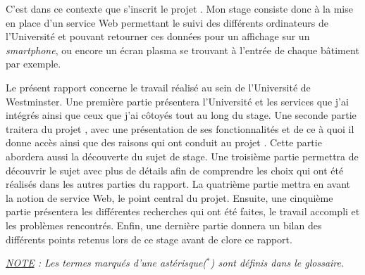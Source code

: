 C'est dans ce contexte que s'inscrit le projet \YuukouII. 
Mon stage consiste donc \`a la mise en place d'un service Web permettant le suivi des diff\'erents ordinateurs de l'Universit\'e et pouvant retourner ces donn\'ees pour un affichage sur un \textit{smartphone}, ou encore un \'ecran plasma se trouvant \`a l'entr\'ee de chaque b\^atiment par exemple.

Le pr\'esent rapport concerne le travail r\'ealis\'e au sein de l'Universit\'e de Westminster.
Une premi\`ere partie pr\'esentera l'Universit\'e et les services que j'ai int\'egr\'es ainsi que ceux que j'ai c\^otoy\'es tout au long du stage.
Une seconde partie traitera du projet \Yuukou{}, avec une pr\'esentation de ses fonctionnalit\'es et de ce \`a quoi il donne acc\`es  ainsi que des raisons qui ont conduit au projet \YuukouII.
Cette partie abordera aussi la d\'ecouverte du sujet de stage.
Une troisi\`eme partie permettra de d\'ecouvrir le sujet avec plus de d\'etails afin de comprendre les choix qui ont \'et\'e r\'ealis\'es dans les autres parties du rapport.
La quatri\`eme partie mettra en avant la notion de service Web, le point central du projet.
Ensuite, une cinqui\`eme partie pr\'esentera les diff\'erentes recherches qui ont \'et\'e faites, le travail accompli et les probl\`emes rencontr\'es.
Enfin, une derni\`ere partie donnera un bilan des diff\'erents points retenus lors de ce stage avant de clore ce rapport.

\vspace{1.5cm}

\begin{center}
\textit{\underline{NOTE} : Les termes marqu\'es d'une ast\'erisque($^*$) sont d\'efinis dans le glossaire.}

\end{center}

\clearpage
